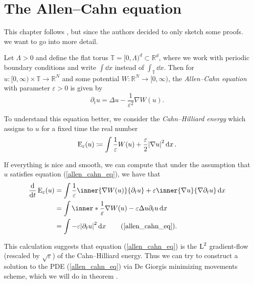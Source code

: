 \chapter{The Allen--Cahn equation}

This chapter follows \cite{convergence_of_allen_cahn_equation_to_multiphase_mean_curvature_flow}, but since the authors decided to only sketch some proofs. we want to go into more detail.

Let $ \Lambda > 0 $ and define the flat torus 
$ \mathbb{T} = [0, \Lambda )^{ d } \subset \mathbb{ R }^{ d } $, 
where we work with periodic boundary conditions and write $ \int \dd{x} $ instead of $ \int_{ \mathbb{ T } } \dd{x} $.
Then for 
$ u \colon [ 0 , \infty ) \times \mathbb{ T } \to \mathbb{ R }^{ N } $ 
and some potential 
$ W \colon \mathbb{ R }^{ N } \to [0, \infty ) $,
the \emph{Allen--Cahn equation} with parameter $ \varepsilon > 0 $ is given by
\begin{equation}
	\label{allen_cahn_eq}
	\partial_{ t } u 
	=
	\Delta u - \frac{1 }{ \varepsilon^{ 2 } } \nabla W ( u ).
\end{equation}

To understand this equation better, we consider the \emph{Cahn--Hilliard energy} which assigns to $ u $ for a fixed time the real number
\begin{equation}
	\label{cahn_hilliard_energy}
	\operatorname{E}_{ \varepsilon } 
		(u)
	\coloneqq
	\int
		\frac{ 1 }{ \varepsilon }
		W ( u )
		+
		\frac{ \varepsilon }{ 2 }
		\abs{ \nabla u }^{ 2 }
	\dd{x}.
\end{equation}

If everything is nice and smooth, we can compute that under the assumption that $ u $ satisfies 
equation (\ref{allen_cahn_eq}), we have that
\begin{align*}
	\dv{t} \energy_{ \varepsilon } ( u )
	&=
	\int
		\frac{ 1 }{ \varepsilon }
		\inner{\nabla W ( u )}{ \partial_{ t } u}
		+
		\varepsilon
		\inner{\nabla u}{ \nabla \partial_{ t } u}
	\dd{x}
	\\
	&=
	\int
		\inner*{ \frac{ 1 }{\varepsilon } \nabla W ( u ) - \varepsilon \Delta u  }{ \partial_{ t } u }
	\dd{x}
	\\
	&=
	\int - \varepsilon \abs{ \partial_{ t } u }^{ 2 } \dd{ x }
	\tag{\ref{allen_cahn_eq}}.
\end{align*}

This calculation suggests that equation (\ref{allen_cahn_eq}) is the $ \operatorname{L}^{ 2 } $ gradient-flow (rescaled by $ \sqrt{\varepsilon} $) of the Cahn--Hilliard energy. Thus we can try to construct a solution to the PDE (\ref{allen_cahn_eq}) via De Giorgis minimizing movements scheme, which we will do in theorem .

